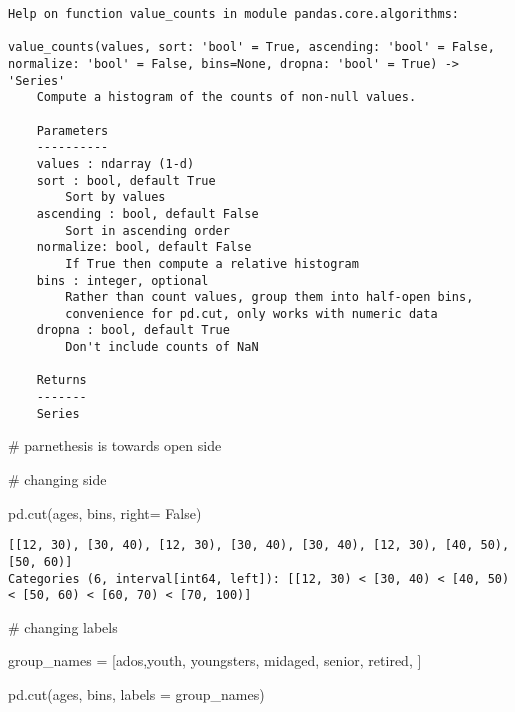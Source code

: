 \documentclass[
  letterpaper,
  DIV=11,
  numbers=noendperiod]{scrreprt}
\newenvironment{Shaded}{\begin{snugshade}}{\end{snugshade}}
\newcommand{\CommentTok}[1]{\textcolor[rgb]{0.37,0.37,0.37}{#1}}
\newcommand{\NormalTok}[1]{\textcolor[rgb]{0.00,0.23,0.31}{#1}}
\newcommand{\OperatorTok}[1]{\textcolor[rgb]{0.37,0.37,0.37}{#1}}
\newcommand{\StringTok}[1]{\textcolor[rgb]{0.13,0.47,0.30}{#1}}
\newcommand{\VariableTok}[1]{\textcolor[rgb]{0.07,0.07,0.07}{#1}}
\begin{document}
\begin{verbatim}
Help on function value_counts in module pandas.core.algorithms:

value_counts(values, sort: 'bool' = True, ascending: 'bool' = False, normalize: 'bool' = False, bins=None, dropna: 'bool' = True) -> 'Series'
    Compute a histogram of the counts of non-null values.
    
    Parameters
    ----------
    values : ndarray (1-d)
    sort : bool, default True
        Sort by values
    ascending : bool, default False
        Sort in ascending order
    normalize: bool, default False
        If True then compute a relative histogram
    bins : integer, optional
        Rather than count values, group them into half-open bins,
        convenience for pd.cut, only works with numeric data
    dropna : bool, default True
        Don't include counts of NaN
    
    Returns
    -------
    Series
\end{verbatim}

\begin{Shaded}
\begin{Highlighting}[]
\CommentTok{\# parnethesis is towards open side}

\CommentTok{\# changing side}

\NormalTok{pd.cut(ages, bins, right}\OperatorTok{=} \VariableTok{False}\NormalTok{)}
\end{Highlighting}
\end{Shaded}

\begin{verbatim}
[[12, 30), [30, 40), [12, 30), [30, 40), [30, 40), [12, 30), [40, 50), [50, 60)]
Categories (6, interval[int64, left]): [[12, 30) < [30, 40) < [40, 50) < [50, 60) < [60, 70) < [70, 100)]
\end{verbatim}

\begin{Shaded}
\begin{Highlighting}[]
\CommentTok{\# changing labels}

\NormalTok{group\_names }\OperatorTok{=}\NormalTok{ [}\StringTok{\textquotesingle{}ados\textquotesingle{}}\NormalTok{,}\StringTok{\textquotesingle{}youth\textquotesingle{}}\NormalTok{, }\StringTok{\textquotesingle{}youngsters\textquotesingle{}}\NormalTok{, }\StringTok{\textquotesingle{}midaged\textquotesingle{}}\NormalTok{, }\StringTok{\textquotesingle{}senior\textquotesingle{}}\NormalTok{, }\StringTok{\textquotesingle{}retired\textquotesingle{}}\NormalTok{, ]}

\NormalTok{pd.cut(ages, bins, labels }\OperatorTok{=}\NormalTok{ group\_names)}
\end{Highlighting}
\end{Shaded}
\end{document}
